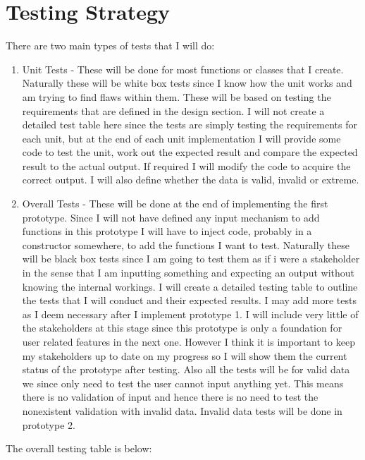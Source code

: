 \documentclass[../../../../main.tex]{subfiles}
\begin{document}
\section{Testing Strategy}
There are two main types of tests that I will do:
\begin{enumerate}
 \item Unit Tests - These will be done for most functions or classes that I create. Naturally these will be white box tests since I  know how the unit works and am trying to find flaws within them. These will be based on testing the requirements that are defined in the design section. I will not create a detailed test table here since the tests are simply testing the requirements for each unit, but at the end of each unit implementation I will provide some code to test the unit, work out the expected result and compare the expected result to the actual output. If required I will modify the code to acquire the correct output. I will also define whether the data is valid, invalid or extreme.
 \item Overall Tests - These will be done at the end of implementing the first prototype. Since I will not have defined any input mechanism to add functions in this prototype I will have to inject code, probably in a constructor somewhere, to add the functions I want to test. Naturally these will be black box tests since I am going to test them as if i were a stakeholder in the sense that I am inputting something and expecting an output without knowing the internal workings. I will create a detailed testing table to outline the tests that I will conduct and their expected results. I may add more tests as I deem necessary after I implement prototype 1. I will include very little of the stakeholders at this stage since this prototype is only a foundation for user related features in the next one. However I think it is important to keep my stakeholders up to date on my progress so I will show them the current status of the prototype after testing. Also all the tests will be for valid data we since only need to test the user cannot input anything yet. This means there is no validation of input and hence there is no need to test the nonexistent validation with invalid data. Invalid data tests will be done in prototype 2.
\end{enumerate}
The overall testing table is below:
\end{document}
